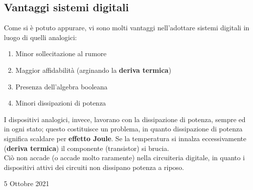 \documentclass[a4paper]{extarticle}
\begin{document}
\subsection{Vantaggi sistemi digitali}
Come si è potuto appurare, vi sono molti vantaggi nell'adottare sistemi digitali in luogo di quelli analogici:
\begin{enumerate}
    \item Minor sollecitazione al rumore
    \item Maggior affidabilità (arginando la \textbf{deriva termica})
    \item Presenza dell'algebra booleana
    \item Minori dissipazioni di potenza
\end{enumerate}
I dispositivi analogici, invece, lavorano con la dissipazione di potenza, sempre ed in ogni stato; questo costituisce un problema, in quanto dissipazione di potenza significa scaldare per \textbf{effetto Joule}. Se la temperatura si innalza eccessivamente (\textbf{deriva termica}) il componente (transistor) si brucia.\\
Ciò non accade (o accade molto raramente) nella circuiteria digitale, in quanto i dispositivi attivi dei circuiti non dissipano potenza a riposo.

\newpage
\begin{center}
    5 Ottobre 2021
\end{center}
\end{document}
